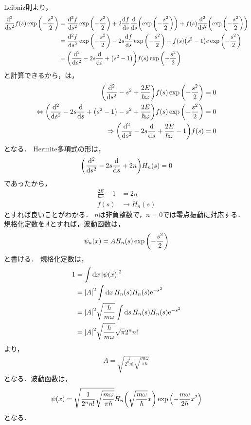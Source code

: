 \documentclass{report}
\begin{document}
    Leibniz則より，
    \begin{align}
      \dv[2]{s}f(s)\exp\qty(-\frac{s^2}{2}) &= \dv[2]{f}{s}\exp\qty(-\frac{s^2}{2}) + 2\dv{f}{s}\dv{s}\qty(\exp\qty(-\frac{s^2}{2})) + f(s)\dv[2]{s}\qty(\exp\qty(-\frac{s^2}{2})) \\ 
      &= \dv[2]{f}{s}\exp\qty(-\frac{s^2}{2}) - 2s\dv{f}{s}\exp\qty(-\frac{s^2}{2}) + f(s)\qty(s^2 - 1)e\exp\qty(-\frac{s^2}{2}) \\ 
      &= \qty(\dv[2]{s} - 2s\dv{s} + \qty(s^2 - 1))f(s)\exp\qty(-\frac{s^2}{2})
    \end{align}
    と計算できるから，は，
    \begin{align}
      \qty(\dv[2]{s} - s^2 + \frac{2E}{\hbar\omega})f(s)\exp\qty(-\frac{s^2}{2}) &= 0 \\ 
      \Leftrightarrow \qty(\dv[2]{s} - 2s\dv{s} + \qty(s^2 - 1) - s^2 + \frac{2E}{\hbar\omega})f(s)\exp\qty(-\frac{s^2}{2}) &= 0 \\ 
      \Rightarrow \qty(\dv[2]{s} - 2s\dv{s} + \frac{2E}{\hbar\omega} - 1)f(s) &= 0
    \end{align}
    となる．
    Hermite多項式の形は，
    \begin{align}
      \qty(\dv[2]{s} - 2s\dv{s} + 2n)H_n(s) = 0
    \end{align}
    であったから，
    \begin{align}
      \frac{2E}{\hbar\omega} - 1 &= 2n \\ 
      f(s) &\to H_n(s)
    \end{align}
    とすれば良いことがわかる．
    $n$は非負整数で，$n = 0$では零点振動に対応する．
    規格化定数を$A$とすれば，波動函数は，
    \begin{align}
      \psi_n(x) = AH_n(s)\exp\qty(-\frac{s^2}{2})
    \end{align}
    と書ける．
    規格化定数は，
    \begin{align}
      1 &= \int\dd{x}\abs{\psi(x)}^2 \\ 
      &= \abs{A}^2\int\dd{x}H_n(s)H_n(s)\mathrm{e}^{-s^2} \\ 
      &= \abs{A}^2\sqrt{\frac{\hbar}{m\omega}}\int\dd{s}H_n(s)H_n(s)\mathrm{e}^{-s^2} \\ 
      &= \abs{A}^2\sqrt{\frac{\hbar}{m\omega}}\sqrt{\pi}2^nn! 
    \end{align}
    より，
    \begin{align}
      A = \sqrt{\frac{1}{2^nn!}\sqrt{\frac{m\omega}{\pi\hbar}}}
    \end{align}
    となる．波動函数は，
    \begin{align}
      \psi(x) = \sqrt{\frac{1}{2^nn!}\sqrt{\frac{m\omega}{\pi\hbar}}}H_n\qty(\sqrt{\frac{m\omega}{\hbar}}x)\exp\qty(-\frac{m\omega}{2\hbar}x^2)
    \end{align}
    となる．
\end{document}
